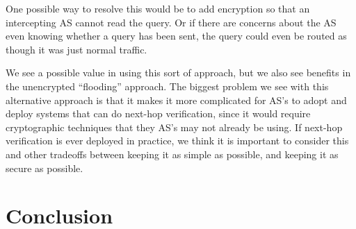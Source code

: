 \documentclass[10pt]{article}
\begin{document}
One possible way to resolve this would be to add encryption so that an intercepting AS cannot read the query. Or if there are concerns about the AS even knowing whether a query has been sent, the query could even be routed as though it was just normal traffic.

We see a possible value in using this sort of approach, but we also see benefits in the unencrypted ``flooding'' approach. The biggest problem we see with this alternative approach is that it makes it more complicated for AS's to adopt and deploy systems that can do next-hop verification, since it would require cryptographic techniques that they AS's may not already be using. If next-hop verification is ever deployed in practice, we think it is important to consider this and other tradeoffs between keeping it as simple as possible, and keeping it as secure as possible.

\section{Conclusion}

{}


\clearpage
\end{document}
